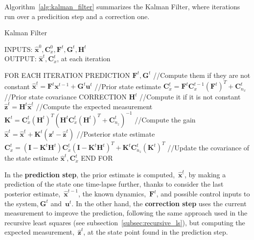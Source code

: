 Algorithm~\ref{alg:kalman_filter} summarizes the Kalman Filter, where iterations run over a predicition step and a correction one. 
\begin{algorithm}
\caption{Kalman Filter}
INPUTS: $\hat{\mathbf{x}}^0,\mathbf{C}^0_x,\mathbf{F}^t,\mathbf{G}^t,\mathbf{H}^t$\\
OUTPUT: $\hat{\mathbf{x}}^t,\mathbf{C}^t_x$, at each iteration
\begin{algorithmic}
\STATE FOR EACH ITERATION
\STATE \hspace{0.5cm} PREDICTION
\STATE \hspace{1cm} $\mathbf{F}^t,\mathbf{G}^t$ //Compute them if they are not constant
\STATE \hspace{1cm} $\hat{\mathbf{x}}^{\underline{t}} = \mathbf{F}^t\mathbf{x}^{t-1} + \mathbf{G}^t\mathbf{u}^{t}$ //Prior state estimate
\STATE \hspace{1cm} $\mathbf{C}^{\underline{t}}_x = \mathbf{F}^t\mathbf{C}^{t-1}_x(\mathbf{F}^t)^T + \mathbf{C}^t_{n_x}$ //Prior state covariance
\STATE \hspace{0.5cm} CORRECTION
\STATE \hspace{1cm} $\mathbf{H}^t$ //Compute it if it is not constant
\STATE \hspace{1cm} $\hat{\mathbf{z}}^t = \mathbf{H}^t\hat{\mathbf{x}}^{\underline{t}}$ //Compute the expected measurement 
\STATE \hspace{1cm} $\mathbf{K}^t = \mathbf{C}^{\underline{t}}_x(\mathbf{H}^t)^T(\mathbf{H}^t\mathbf{C}^{\underline{t}}_x(\mathbf{H}^t)^T+\mathbf{C}^t_{n_z})^{-1}$ 
//Compute the gain
\STATE \hspace{1cm} $\hat{\mathbf{x}}^t = \hat{\mathbf{x}}^{\underline{t}} + \mathbf{K}^t(\mathbf{z}^t - \hat{\mathbf{z}}^t)$ //Posterior state estimate
\STATE \hspace{1cm} $\mathbf{C}^t_{x} = (\mathbf{I}-\mathbf{K}^t\mathbf{H}^t)\mathbf{C}^{\underline{t}}_x(\mathbf{I}-\mathbf{K}^t\mathbf{H}^t)^T
		    + \mathbf{K}^t\mathbf{C}^t_{n_z}(\mathbf{K}^t)^T$ //Update the covariance of the state estimate
\RETURN $\hat{\mathbf{x}}^t,\mathbf{C}^t_x$		    
\STATE END FOR
\end{algorithmic}
\label{alg:kalman_filter}
\end{algorithm}

In the \textbf{prediction step}, the prior estimate is computed,~$\hat{\mathbf{x}}^{\underline{t}}$, by making a prediction of the state one time-lapse further, thanks to consider the last posterior estimate,~$\hat{\mathbf{x}}^{t-1}$, the known dynamics,~$\mathbf{F}^t$, and possible control inputs to the system,$~\mathbf{G}^t$ and~$\mathbf{u}^t$. In the other hand, the \textbf{correction step} uses the current measurement to improve the prediction, following the same approach used in the recursive least squares (see subsection~\ref{subsec:recursive_ls}), but computing the expected measurement,~$\hat{\mathbf{z}}^t$, at the state point found in the prediction step. 

